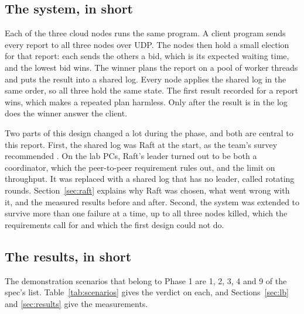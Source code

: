 \subsection{The system, in short}

Each of the three cloud nodes runs the same program. A client program sends every report to all three nodes over UDP. The nodes then hold a small election for that report: each sends the others a bid, which is its expected waiting time, and the lowest bid wins. The winner plans the report on a pool of worker threads and puts the result into a shared log. Every node applies the shared log in the same order, so all three hold the same state. The first result recorded for a report wins, which makes a repeated plan harmless. Only after the result is in the log does the winner answer the client.

Two parts of this design changed a lot during the phase, and both are central to this report. First, the shared log was Raft at the start, as the team's survey recommended \cite{survey}. On the lab PCs, Raft's leader turned out to be both a coordinator, which the peer-to-peer requirement rules out, and the limit on throughput. It was replaced with a shared log that has no leader, called rotating rounds. Section~\ref{sec:raft} explains why Raft was chosen, what went wrong with it, and the measured results before and after. Second, the system was extended to survive more than one failure at a time, up to all three nodes killed, which the requirements call for and which the first design could not do.

\subsection{The results, in short}

The demonstration scenarios that belong to Phase 1 are 1, 2, 3, 4 and 9 of the spec's list. Table~\ref{tab:scenarios} gives the verdict on each, and Sections~\ref{sec:lb} and \ref{sec:results} give the measurements.

